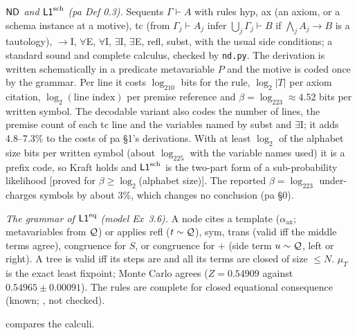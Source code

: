 \emph{$\mathsf{ND}$ and $\mathord{\mathsf{L1}}^{\mathrm{sch}}$ (pa Def 0.3).} Sequents $\Gamma\vdash A$ with rules hyp, ax (an axiom, or a schema instance at a motive), tc (from $\Gamma_j\vdash A_j$ infer $\bigcup_j\Gamma_j\vdash B$ if $\bigwedge_jA_j\to B$ is a tautology), $\to$I, $\forall$E, $\forall$I, $\exists$I, $\exists$E, refl, subst, with the usual side conditions; a standard sound and complete calculus, checked by \texttt{nd.py}. The derivation is written schematically in a predicate metavariable $P$ and the motive is coded once by the grammar. Per line it costs $\log_210$ bits for the rule, $\log_2|T|$ per axiom citation, $\log_2(\text{line index})$ per premise reference and $\beta=\log_223\approx4.52$ bits per written symbol. The decodable variant also codes the number of lines, the premise count of each tc line and the variables named by subst and $\exists$I; it adds 4.8--7.3\% to the costs of pa \S1's derivations. With at least $\log_2$ of the alphabet size bits per written symbol (about $\log_225$ with the variable names used) it is a prefix code, so Kraft holds and $\mathord{\mathsf{L1}}^{\mathrm{sch}}$ is the two-part form of a sub-probability likelihood [proved for $\beta\ge\log_2$(alphabet size)]. The reported $\beta=\log_223$ under-charges symbols by about 3\%, which changes no conclusion (pa \S0).

\emph{The grammar of $\mathord{\mathsf{L1}}^{\mathrm{eq}}$ (model Ex~3.6).} A node cites a template ($\alpha_{\mathrm{ax}}$; metavariables from $\mathcal{Q}$) or applies refl ($t\sim\mathcal{Q}$), sym, trans (valid iff the middle terms agree), congruence for $S$, or congruence for $+$ (side term $u\sim\mathcal{Q}$, left or right). A tree is valid iff its steps are and all its terms are closed of size $\le N$. $\mu_T$ is the exact least fixpoint; Monte Carlo agrees ($Z=0.54909$ against $0.54965\pm0.00091$). The rules are complete for closed equational consequence (known; \citealp{birkhoff1935structure}, not checked).

 compares the calculi.

